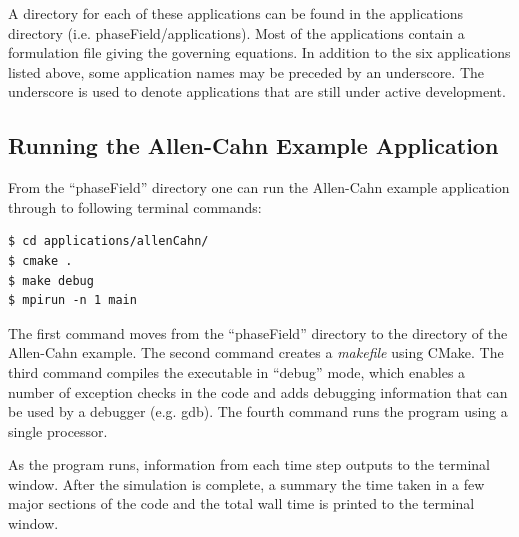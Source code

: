 \documentclass[10pt]{article} %
\begin{document}
A directory for each of these applications can be found in the applications directory (i.e. phaseField/applications). Most of the applications contain a formulation file giving the governing equations. In addition to the six applications listed above, some application names may be preceded by an underscore. The underscore is used to denote applications that are still under active development.

\subsection{Running the Allen-Cahn Example Application} \label{allen_cahn_instructions}
From the ``phaseField'' directory one can run the Allen-Cahn example application through to following terminal commands:
\begin{lstlisting}
$ cd applications/allenCahn/ 
$ cmake . 
$ make debug 
$ mpirun -n 1 main 
\end{lstlisting}

The first command moves from the ``phaseField'' directory to the directory of the Allen-Cahn example. The second command creates a \emph{makefile} using CMake. The third command compiles the executable in ``debug'' mode, which enables a number of exception checks in the code and adds debugging information that can be used by a debugger (e.g. gdb). The fourth command runs the program using a single processor.

As the program runs, information from each time step outputs to the terminal window. After the simulation is complete, a summary the time taken in a few major sections of the code and the total wall time is printed to the terminal window. 
\end{document}
